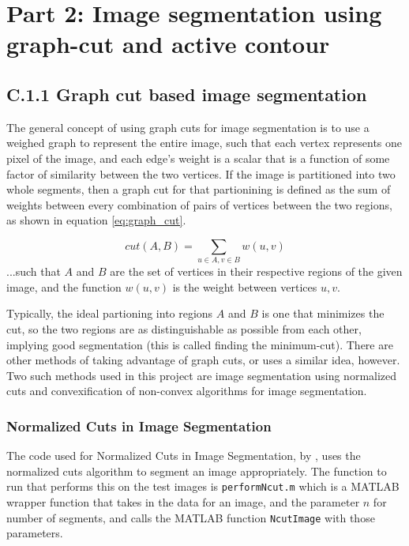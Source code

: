 \documentclass{article}
\begin{document}
\clearpage
\section*{Part 2: Image segmentation using graph-cut and active contour}

\subsection*{C.1.1 Graph cut based image segmentation}

The general concept of using graph cuts for image segmentation is to use a weighed graph to represent the entire image, such that each vertex represents one pixel of the image, and each edge's weight is a scalar that is a function of some factor of similarity between the two vertices. If the image is partitioned into two whole segments, then a graph cut for that partionining is defined as the sum of weights between every combination of pairs of vertices between the two regions, as shown in equation \ref{eq:graph_cut}.

\begin{equation}
cut(A,B) = \sum_{u\in A,v\in B} w(u,v)
\label{eq:graph_cut}
\end{equation}
...such that $A$ and $B$ are the set of vertices in their respective regions of the given image, and the function $w(u,v)$ is the weight between vertices $u,v$.

Typically, the ideal partioning into regions $A$ and $B$ is one that minimizes the cut, so the two regions are as distinguishable as possible from each other, implying good segmentation (this is called finding the minimum-cut). There are other methods of taking advantage of graph cuts, or uses a similar idea, however. Two such methods used in this project are image segmentation using normalized cuts and convexification of non-convex algorithms for image segmentation.

\subsubsection*{Normalized Cuts in Image Segmentation}

The code used for Normalized Cuts in Image Segmentation, by \cite{ncut_code}, uses the normalized cuts algorithm to segment an image appropriately. The function to run that performs this on the test images is \texttt{performNcut.m} which is a MATLAB wrapper function that takes in the data for an image, and the parameter $n$ for number of segments, and calls the MATLAB function \texttt{NcutImage} with those parameters.
\end{document}
